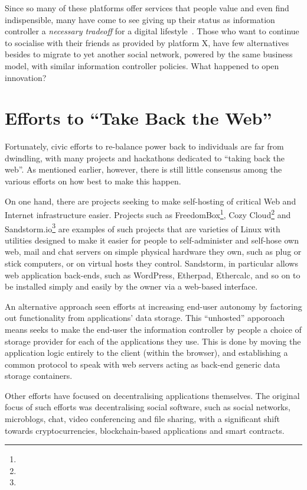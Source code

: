 \documentclass{amsart}
\begin{document}
Since so many of these platforms offer services that people value and even find indispensible, many have come to see giving up their status as information controller a \emph{necessary tradeoff} for a digital lifestyle~\cite{}. Those who want to continue to socialise with their friends as provided by platform X, have few alternatives besides to migrate to yet another social network, powered by the same business model, with similar information controller policies.  What happened to open innovation? 

\section{Efforts to ``Take Back the Web''}

Fortunately, civic efforts to re-balance power back to individuals are far from dwindling, with many projects and hackathons dedicated to ``taking back the web''.  As mentioned earlier, however, there is still little consensus among the various efforts on how best to make this happen.  

On one hand, there are projects seeking to make self-hosting of critical Web and Internet infrastructure easier. Projects such as FreedomBox\footnote{}, Cozy Cloud\footnote{} and Sandstorm.io\footnote{} are examples of such projects that are varieties of Linux with utilities designed to make it easier for people to self-administer and self-hose own web, mail and chat servers on simple physical hardware they own, such as plug or stick computers, or on virtual hosts they control.  Sandstorm, in particular allows web application back-ends, such as WordPress, Etherpad, Ethercalc, and so on to be installed simply and easily by the owner via a web-based interface.  

An alternative approach seen efforts at increasing end-user autonomy by factoring out functionality from applications' data storage.  This ``unhosted'' apporoach means seeks to make the end-user the information controller by people a choice of storage provider for each of the applications they use.  This is done by moving the application logic entirely to the client (within the browser), and establishing a common protocol to speak with web servers acting as back-end generic data storage containers.

Other efforts have focused on decentralising applications themselves.  The original focus of such efforts was  decentralising social software, such as social networks, microblogs, chat, video conferencing and file sharing, with a significant shift towards cryptocurrencies, blockchain-based applications and smart contracts. 
\end{document}
